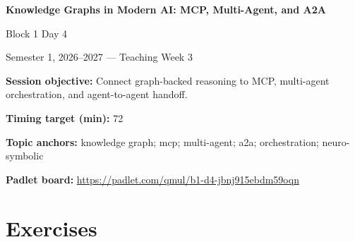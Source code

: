 \documentclass[11pt]{article}
\begin{document}
\begin{center}\LARGE\bfseries Knowledge Graphs in Modern AI: MCP, Multi-Agent, and A2A\end{center}

\begin{center}\large Block 1 Day 4\end{center}

\begin{center}Semester 1, 2026--2027 --- Teaching Week 3\end{center}

\begin{tcolorbox}[colback=MidnightBlue!4,colframe=MidnightBlue,title={Session Overview},fonttitle=\bfseries,breakable]
\textbf{Session objective:} Connect graph-backed reasoning to MCP, multi-agent orchestration, and agent-to-agent handoff.

\textbf{Timing target (min):} 72

\textbf{Topic anchors:} knowledge graph; mcp; multi-agent; a2a; orchestration; neuro-symbolic

\textbf{Padlet board:} \url{https://padlet.com/qmul/b1-d4-jbnj915ebdm59oqn}
\end{tcolorbox}

\section*{Exercises}
\end{document}
